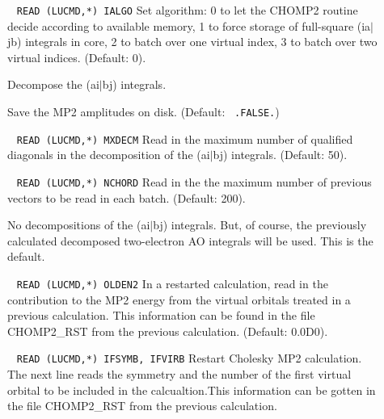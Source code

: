 \begin{description}
\item[]\verb| |\newline
\verb|READ (LUCMD,*) IALGO|\newline
        Set algorithm: 0 to let the CHOMP2 routine decide according
        to available memory,
        1 to force storage of full-square (ia$\mid$jb) integrals 
        in core, 2 to batch over one virtual index, 3 to batch
        over two virtual indices. (Default: 0).
%
\item[] 
        Decompose the (ai$\mid$bj) integrals. 
%
\item[] 
        Save the MP2 amplitudes on disk. (Default: 
        \verb| .FALSE.|)
%
\item[] \verb| |\newline
\verb|READ (LUCMD,*) MXDECM|\newline
        Read in the maximum number of qualified diagonals in
        the decomposition of the (ai$\mid$bj) integrals. (Default: 50).
%
\item[] \verb| |\newline
\verb|READ (LUCMD,*) NCHORD|\newline
        Read in the the maximum number of previous vectors
        to be read in each batch. (Default: 200).
%
\item[] 
        No decompositions of the (ai$\mid$bj) integrals. But, of course,
        the previously calculated decomposed two-electron AO integrals
        will be used. This is the default.
%
\item[] \verb| |\newline
\verb|READ (LUCMD,*) OLDEN2|\newline
        In a restarted calculation, read in the contribution
        to the MP2 energy from the virtual orbitals treated in
        a previous calculation. This information can be found in
        the file CHOMP2\_RST from the previous 
        calculation. (Default: 0.0D0).
%
\item[] \verb| |\newline
\verb|READ (LUCMD,*) IFSYMB, IFVIRB|\newline
        Restart Cholesky MP2 calculation. The next line reads
        the symmetry and the number of the first virtual orbital 
        to be included in the calcualtion.This information can 
        be gotten in the file CHOMP2\_RST from the previous 
        calculation. 

\end{description}

